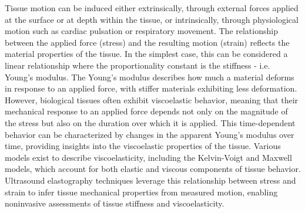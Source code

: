 Tissue motion can be induced either extrinsically, through external forces applied at the surface or at depth within the tissue, or intrinsically, through physiological motion such as cardiac pulsation or respiratory movement. The relationship between the applied force (stress) and the resulting motion (strain) reflects the material properties of the tissue. In the simplest case, this can be considered a linear relationship where the proportionality constant is the stiffness - i.e. Young's modulus. The Young's modulus describes how much a material deforms in response to an applied force, with stiffer materials exhibiting less deformation. However, biological tissues often exhibit viscoelastic behavior, meaning that their mechanical response to an applied force depends not only on the magnitude of the stress but also on the duration over which it is applied. This time-dependent behavior can be characterized by changes in the apparent Young's modulus over time, providing insights into the viscoelastic properties of the tissue. Various models exist to describe viscoelasticity, including the Kelvin-Voigt and Maxwell models, which account for both elastic and viscous components of tissue behavior. Ultrasound elastography techniques leverage this relationship between stress and strain to infer tissue mechanical properties from measured motion, enabling noninvasive assessments of tissue stiffness and viscoelasticity.


